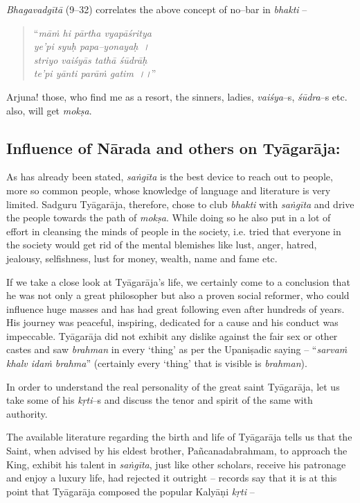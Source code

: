\textit{Bhagavadgītā} (9–32) correlates the above concept of no–bar in \textit{bhakti} –

\begin{verse}
“\textit{māṁ hi pārtha vyapāśritya}\\\textit{ye’pi syuḥ papa–yonayaḥ~।}\\\textit{striyo vaiśyās tathā śūdrāḥ} \\\textit{te’pi yānti parāṁ gatim~।।}”
\end{verse}

Arjuna! those, who find me as a resort, the sinners, ladies, \textit{vaiśya}–s, \textit{śūdra}–s etc. also, will get \textit{mokṣa}.


\subsection*{Influence of Nārada and others on Tyāgarāja:}

As has already been stated, \textit{saṅgīta} is the best device to reach out to people, more so common people, whose knowledge of language and literature is very limited. Sadguru Tyāgarāja, therefore, chose to club \textit{bhakti} with \textit{saṅgīta} and drive the people towards the path of \textit{mokṣa}. While doing so he also put in a lot of effort in cleansing the minds of people in the society, i.e. tried that everyone in the society would get rid of the mental blemishes like lust, anger, hatred, jealousy, selfishness, lust for money, wealth, name and fame etc. 

If we take a close look at Tyāgarāja’s life, we certainly come to a conclusion that he was not only a great philosopher but also a proven social reformer, who could influence huge masses and has had great following even after hundreds of years. His journey was peaceful, inspiring, dedicated for a cause and his conduct was impeccable. Tyāgarāja did not exhibit any dislike against the fair sex or other castes and saw \textit{brahman} in every ‘thing’ as per the Upaniṣadic saying – “\textit{sarvaṁ khalv idaṁ brahma}” (certainly every ‘thing’ that is visible is \textit{brahman}).

In order to understand the real personality of the great saint Tyāgarāja, let us take some of his \textit{kṛti}–s and discuss the tenor and spirit of the same with authority.

The available literature regarding the birth and life of Tyāgarāja tells us that the Saint, when advised by his eldest brother, Pañcanadabrahmam, to approach the King, exhibit his talent in \textit{saṅgīta}, just like other scholars, receive his patronage and enjoy a luxury life, had rejected it outright – records say that it is at this point that Tyāgarāja composed the popular Kalyāṇi \textit{kṛti} –

